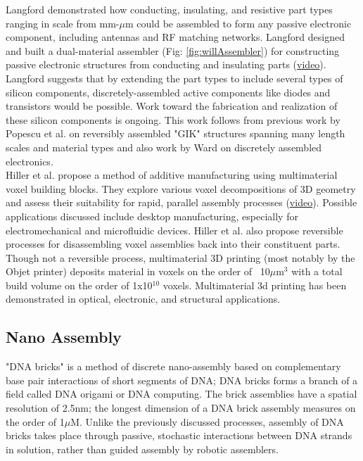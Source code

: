 {Langford demonstrated how conducting, insulating, and resistive part types ranging in scale from mm-$\mu$m could be assembled to form any passive electronic component, including antennas and RF matching networks\cite{Langford2014}.  Langford designed and built a dual-material assembler (Fig: \ref{fig:willAssembler}) for constructing passive electronic structures from conducting and insulating parts (\href{http://dma.cba.mit.edu/stapler/video/dualstapler_full_1.mp4}{video})\cite{LangfordWillGhassaeiAmandaGershenfeld2016}.  Langford suggests that by extending the part types to include several types of silicon components, discretely-assembled active components like diodes and transistors would be possible.  Work toward the fabrication and realization of these silicon components is ongoing.  This work follows from previous work by Popescu et al. on reversibly assembled "GIK" structures spanning many length scales and material types\cite{Popescu} and also work by Ward on discretely assembled electronics\cite{Ward2010}.
\\

Hiller et al. propose a method of additive manufacturing using multimaterial voxel building blocks\cite{Hiller2009a}.  They explore various voxel decompositions of 3D geometry and assess their suitability for rapid, parallel assembly processes (\href{https://www.youtube.com/watch?v=-szjlhVMGh4}{video}).  Possible applications discussed include desktop manufacturing, especially for electromechanical and microfluidic devices.  Hiller et al. also propose reversible processes for disassembling voxel assemblies back into their constituent parts\cite{Hiller2005}.
\\

Though not a reversible process, multimaterial 3D printing (most notably by the Objet printer) deposits material in voxels on the order of ~10$\mu$m$^{3}$ with a total build volume on the order of 1x10$^{10}$ voxels\cite{Objet1000}.  Multimaterial 3d printing has been demonstrated in optical\cite{Willis2012}, electronic\cite{Ahn2009}, and structural applications\cite{Skouras2013}\cite{Schumacher}\cite{Bacher2014}.

\subsection{Nano Assembly}

"DNA bricks" is a method of discrete nano-assembly based on complementary base pair interactions of short segments of DNA\cite{Ke2012}; DNA bricks forms a branch of a field called DNA origami\cite{Rothemund2006} or DNA computing\cite{Seeman1982}\cite{Adleman1994}.  The brick assemblies have a spatial resolution of 2.5nm; the longest dimension of a DNA brick assembly measures on the order of 1$\mu$M\cite{Ke2014}.  Unlike the previously discussed processes, assembly of DNA bricks takes place through passive, stochastic interactions between DNA strands in solution, rather than guided assembly by robotic assemblers.
\\

}
